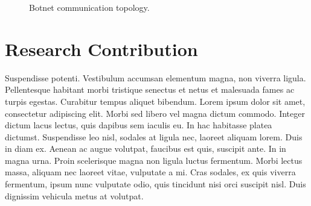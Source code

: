 \begin{figure}[hbtp!]
    \hfill
    \caption{Botnet communication topology.}
    \label{fig:BotnetCommunicationTopology}
\end{figure}


\section{Research Contribution}
Suspendisse potenti. Vestibulum accumsan elementum magna, non viverra ligula. Pellentesque habitant morbi tristique senectus et netus et malesuada fames ac turpis egestas. Curabitur tempus aliquet bibendum. Lorem ipsum dolor sit amet, consectetur adipiscing elit. Morbi sed libero vel magna dictum commodo. Integer dictum lacus lectus, quis dapibus sem iaculis eu. In hac habitasse platea dictumst. Suspendisse leo nisl, sodales at ligula nec, laoreet aliquam lorem. Duis in diam ex. Aenean ac augue volutpat, faucibus est quis, suscipit ante. In in magna urna. Proin scelerisque magna non ligula luctus fermentum. Morbi lectus massa, aliquam nec laoreet vitae, vulputate a mi. Cras sodales, ex quis viverra fermentum, ipsum nunc vulputate odio, quis tincidunt nisi orci suscipit nisl. Duis dignissim vehicula metus at volutpat.

